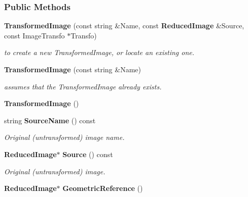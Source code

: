 \subsubsection*{Public Methods}
\begin{CompactItemize}
\item 
{\bf Transformed\-Image} (const string \&Name, const {\bf Reduced\-Image} \&Source, const Image\-Transfo $\ast$Transfo)
\begin{CompactList}\small\item\em to create a new Transformed\-Image, or locate an existing one.\item\end{CompactList}\item 
{}
{\bf Transformed\-Image} (const string \&Name)\label{class_transformedimage_a1}

\begin{CompactList}\small\item\em assumes that the Transformed\-Image already exists.\item\end{CompactList}\item 
{}
{\bf Transformed\-Image} ()\label{class_transformedimage_a2}

\item 
{}
string {\bf Source\-Name} () const\label{class_transformedimage_a3}

\begin{CompactList}\small\item\em Original (untransformed) image name.\item\end{CompactList}\item 
{}
{\bf Reduced\-Image}$\ast$ {\bf Source} () const\label{class_transformedimage_a4}

\begin{CompactList}\small\item\em Original (untransformed) image.\item\end{CompactList}\item 
{}
{\bf Reduced\-Image}$\ast$ {\bf Geometric\-Reference} ()\label{class_transformedimage_a5}


\end{CompactItemize}
